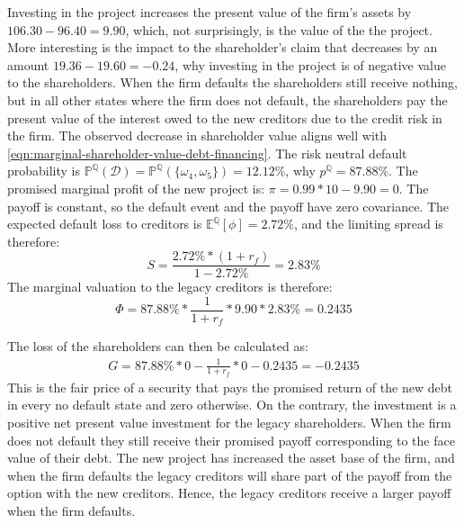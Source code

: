 \documentclass[../main.tex]{subfiles}
\begin{document}
        Investing in the project increases the present value of the firm's assets by $106.30 - 96.40 = 9.90$, which, not surprisingly, is the value of the the project.
        More interesting is the impact to the shareholder's claim that decreases by an amount $19.36 - 19.60 = -0.24$, why investing in the project is of negative value to the shareholders.
        When the firm defaults the shareholders still receive nothing, but in all other states where the firm does not default, the shareholders pay the present value of the interest owed to the new creditors due to the credit risk in the firm.
        The observed decrease in shareholder value aligns well with 
        \cref{eqn:marginal-shareholder-value-debt-financing}. 
        The risk neutral default probability is 
        $\mathbb{P}^{\mathbb{Q}}\left(\mathcal{D}\right) 
            = \mathbb{P}^{\mathbb{Q}}\left(\{\omega_{4}, \omega_{5}\}\right) 
            = 12.12\%$,
        why $p^{\mathbb{Q}} = 87.88\%$.
        The promised marginal profit of the new project is:
        $\pi = 0.99 * 10 - 9.90 = 0$.
        The payoff is constant, so the default event and the payoff have zero covariance. 
        The expected default loss to creditors is 
        $\mathbb{E}^{\mathbb{Q}}\left[\phi\right] = 2.72\%$,
        and the limiting spread is therefore:
        \begin{equation}
            S 
            = \frac{
                2.72\% * (1 + r_{f})
            }{
                1 - 2.72\%
            } 
            = 2.83\%
        \end{equation}
        The marginal valuation to the legacy creditors is therefore:
        \begin{equation}
            \Phi 
            = 87.88\% * \frac{1}{1+r_{f}}  * 9.90 * 2.83\% 
            = 0.2435
        \end{equation}

        The loss of the shareholders can then be calculated as: 
            \begin{align}
                G = 87.88\%*0 - \frac{1}{1+r_{f}} * 0 - 0.2435 = -0.2435
            \end{align}
        This is the fair price of a security that pays the promised return of the new debt in every no default state and zero otherwise. 
        On the contrary, the investment is a positive net present value investment for the legacy shareholders.
        When the firm does not default they still receive their promised payoff corresponding to the face value of their debt.
        The new project has increased the asset base of the firm, and when the firm defaults the legacy creditors will share part of the payoff from the option with the new creditors.
        Hence, the legacy creditors receive a larger payoff when the firm defaults. 
\end{document}
